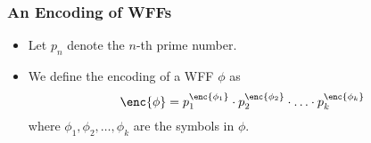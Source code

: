 \documentclass{beamer}
\begin{document}
\begin{frame}
\frametitle{An Encoding of WFFs}
\begin{itemize}
    \item Let $p_n$ denote the $n$-th prime number.
    \item We define the encoding of a WFF $\phi$ as \[
        \enc{\phi} = p_1^{\enc{\phi_1}} \cdot p_2^{\enc{\phi_2}} \cdot \ldots \cdot p_k^{\enc{\phi_k}}
    \] where $\phi_1, \phi_2, \dots, \phi_k$ are the symbols in $\phi$.
\end{itemize}
\end{frame}
\end{document}
